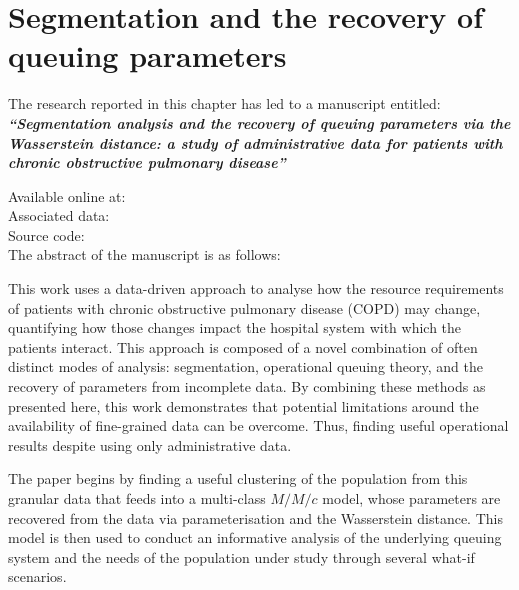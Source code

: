 \chapter{Segmentation and the recovery of queuing parameters}
\label{chp:copd}

\graphicspath{{chapters/copd/paper/img/}}
\renewcommand{\texpath}{chapters/copd/paper/tex}

\begin{center}
    The research reported in this chapter has led to a manuscript
    entitled:\\[1em]

    {%
        \bf\itshape{``Segmentation analysis and the recovery of queuing
                    parameters via the Wasserstein distance: a study of
                    administrative data for patients with chronic obstructive
                    pulmonary disease''}
    }

    Available online at: \\
    Associated data: \\
    Source code: \\[1em]

    The abstract of the manuscript is as follows:\\[1em]
\end{center}

This work uses a data-driven approach to analyse how the resource requirements
of patients with chronic obstructive pulmonary disease (COPD) may change,
quantifying how those changes impact the hospital system with which the patients
interact. This approach is composed of a novel combination of often distinct
modes of analysis: segmentation, operational queuing theory, and the recovery of
parameters from incomplete data. By combining these methods as presented here,
this work demonstrates that potential limitations around the availability of
fine-grained data can be overcome. Thus, finding useful operational results
despite using only administrative data.

The paper begins by finding a useful clustering of the population from this
granular data that feeds into a multi-class \(M/M/c\) model, whose parameters
are recovered from the data via parameterisation and the Wasserstein distance.
This model is then used to conduct an informative analysis of the underlying
queuing system and the needs of the population under study through several
what-if scenarios.

